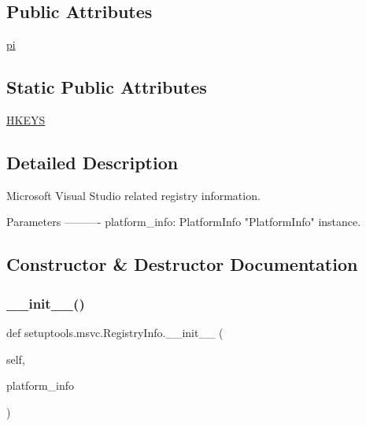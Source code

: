 \subsection*{Public Attributes}
\begin{DoxyCompactItemize}
\item 
\hyperlink{classsetuptools_1_1msvc_1_1RegistryInfo_aa8ed2489936d70edee47f07fdc8820a7}{pi}
\end{DoxyCompactItemize}
\subsection*{Static Public Attributes}
\begin{DoxyCompactItemize}
\item 
\hyperlink{classsetuptools_1_1msvc_1_1RegistryInfo_ae0ddb2af656e0c3892f77268563edbe1}{H\+K\+E\+YS}
\end{DoxyCompactItemize}


\subsection{Detailed Description}
\begin{DoxyVerb}Microsoft Visual Studio related registry information.

Parameters
----------
platform_info: PlatformInfo
    "PlatformInfo" instance.
\end{DoxyVerb}
 

\subsection{Constructor \& Destructor Documentation}
\mbox{\label{classsetuptools_1_1msvc_1_1RegistryInfo_aaf1543da0051dd15ff1198de8fb00dd6}} 
\subsubsection{\texorpdfstring{\+\_\+\+\_\+init\+\_\+\+\_\+()}{\_\_init\_\_()}}
{\footnotesize\ttfamily def setuptools.\+msvc.\+Registry\+Info.\+\_\+\+\_\+init\+\_\+\+\_\+ (\begin{DoxyParamCaption}\item[{}]{self,  }\item[{}]{platform\+\_\+info }\end{DoxyParamCaption})}



